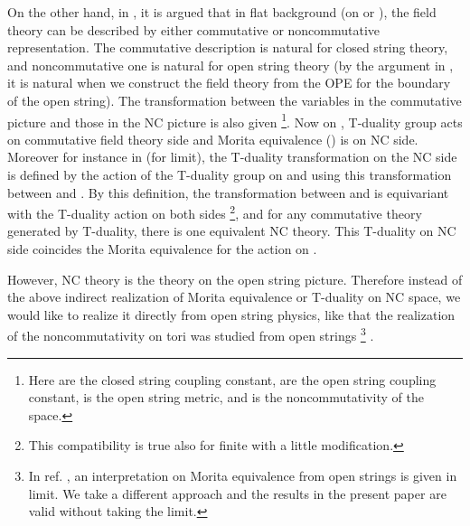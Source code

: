 \documentclass[a4paper,12pt]{article}
\providecommand{\R}{{\mathbb{R}}}
\providecommand{\Z}{{\mathbb{Z}}}
\providecommand{\T}{{\mathbb{T}}}
\def \raw{\rightarrow}
\begin{document}
On the other hand, in \cite{SW}, it is argued that in flat background 
\coordHE{} (on \myHighlight{$\R^d$}\coordHE{}  or \myHighlight{$\T^d$}\coordHE{}), the field theory can be described by 
either commutative or noncommutative representation. 
The commutative description is natural for closed string theory, 
and noncommutative one is natural for open string theory 
(by the argument 
in \cite{SW}, it is natural when we construct the field theory 
from the OPE for the boundary of the open string). 
The transformation between the variables 
in the commutative picture \coordHE{} and those in the NC 
picture \coordHE{} is also given
\footnote{Here \coordHE{} are the closed string coupling constant, 
\coordHE{} are the open string coupling constant, \coordHE{} is the open string metric, 
and \myHighlight{$\Theta$}\coordHE{} is the noncommutativity of the space.}. 
Now on \myHighlight{$\T^d$}\coordHE{}, T-duality group acts on commutative field theory side 
and Morita equivalence (\myHighlight{$SO(d,d |\Z)$}\coordHE{}) is on NC side. 
Moreover for instance in \cite{SW} (for \myHighlight{$|B/g| \raw\infty$}\coordHE{} limit), 
the \myHighlight{$SO(d,d|\Z)$}\coordHE{} T-duality transformation 
on the NC side is defined 
by the action of the T-duality group on \coordHE{} 
and using this transformation between \coordHE{} and \coordHE{}. 
By this definition, 
the transformation between \coordHE{} and \coordHE{} is 
equivariant with the T-duality action on both sides
\footnote{This compatibility is true also for finite \coordHE{} 
with a little modification\cite{PS}. }, 
and for any commutative theory generated by T-duality, 
there is one equivalent NC theory. 
This T-duality on NC side coincides the Morita equivalence 
for the action on \myHighlight{$\Theta$}\coordHE{}. 

However, NC theory is the theory on the open string picture. 
Therefore instead of the above indirect realization of Morita equivalence 
or \myHighlight{$SO(d,d|\Z)$}\coordHE{} T-duality on NC space, 
we would like to realize it 
directly from open string physics, 
like that the realization of the noncommutativity 
on tori was studied from open strings \cite{DH,KO,CK}
\footnote{In ref. \cite{SW}, an interpretation on Morita equivalence 
from open strings is given in \myHighlight{$|B/g|\raw \infty$}\coordHE{} limit. We take a different 
approach and the results in the present paper are valid without taking the 
\myHighlight{$|B/g|\raw \infty$}\coordHE{} limit. }
. 
\end{document}
